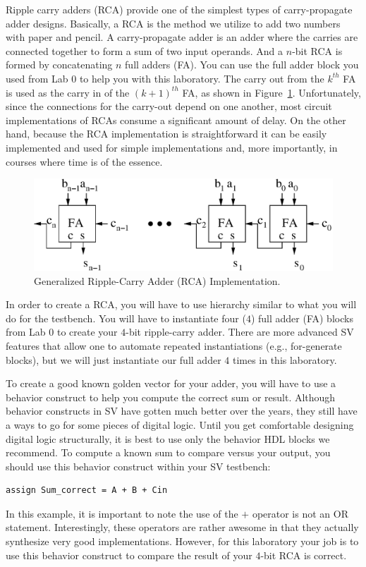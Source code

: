 \documentclass{article}
\begin{document}
Ripple carry adders (RCA) provide one of the simplest types of
carry-propagate adder designs.  Basically, a RCA is the method we
utilize to add two numbers
with paper and pencil.  A carry-propagate adder is an adder
where the carries are connected together to form a sum of two input
operands.  
And a $n$-bit RCA is formed by concatenating $n$ full adders (FA).  You
can use the full adder block you used from Lab 0 to help you with this
laboratory.  
The carry out from the $k^{th}$ FA is used as the carry in of 
the $(k + 1)^{th}$ FA, as shown in Figure~\ref{rca.fig}.  
Unfortunately, since 
the connections for the carry-out depend on one another, 
most circuit implementations of RCAs
consume a significant amount of delay.  On the other hand, 
because the RCA implementation is straightforward
it can be easily implemented and
used for simple implementations and, more importantly, in courses
where time is of the essence.
\begin{figure} [tb]
\begin{center}
\includegraphics[scale=0.7]{rca.eps}
\end{center}
\caption{Generalized Ripple-Carry Adder (RCA) Implementation.}
\label{rca.fig}
\end{figure}

In order to create a RCA, you will have to use hierarchy similar to
what you will do for the testbench.  You will have to instantiate four
($4$) full adder (FA) blocks from Lab 0 to create your $4$-bit
ripple-carry adder.  There are more advanced SV features that
allow one to automate repeated instantiations (e.g., for-generate
blocks), but we will just instantiate our full adder $4$ times in this
laboratory.

To create a good known golden vector for your adder, you will have to
use a behavior construct to help you compute the correct sum or
result.  Although
behavior constructs in SV have gotten much better over the
years, they still have a ways to go for some pieces of digital logic.
Until you get comfortable designing digital logic structurally, it is
best to use only the behavior HDL blocks we recommend.  To compute a
known sum to compare versus your output, you should
use this behavior construct within your SV testbench:
\begin{verbatim}
assign Sum_correct = A + B + Cin
\end{verbatim}
In this example, it is important to note the use of the $+$ operator
is not an OR statement.  Interestingly, these operators
are rather awesome in that they actually synthesize very good
implementations.  However, for this laboratory your job is to use this
behavior construct to compare the result of your $4$-bit RCA is
correct.
\end{document}
